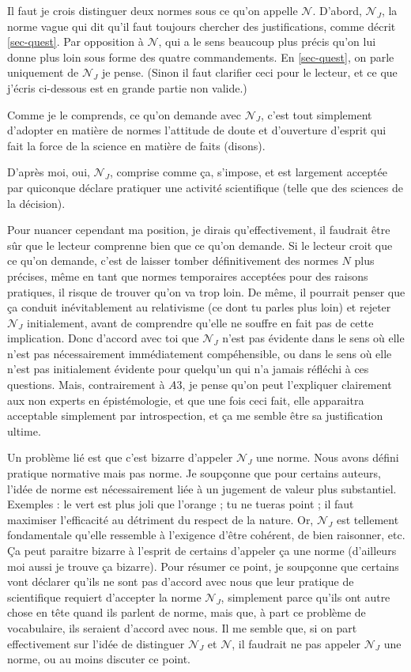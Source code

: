 \documentclass[preprint, french, english, 11pt, authoryear]{elsarticle}%
\newcommand{\adv}{\mathscr{N}}
\newcommand{\fadv}{\mathscr{N}_J}%
\begin{document}
Il faut je crois distinguer deux normes sous ce qu’on appelle $\adv$. D’abord, $\fadv$, la norme vague qui dit qu’il faut toujours chercher des justifications, comme décrit \cref{sec-quest}. Par opposition à $\adv$, qui a le sens beaucoup plus précis qu’on lui donne plus loin sous forme des quatre commandements. En \cref{sec-quest}, on parle uniquement de $\fadv$ je pense. (Sinon il faut clarifier ceci pour le lecteur, et ce que j’écris ci-dessous est en grande partie non valide.)

Comme je le comprends, ce qu’on demande avec $\fadv$, c’est tout simplement d’adopter en matière de normes l’attitude de doute et d’ouverture d’esprit qui fait la force de la science en matière de \og{}faits\fg{} (disons).

D’après moi, oui, $\fadv$, comprise comme ça, s’impose, et est largement acceptée par quiconque déclare pratiquer une activité scientifique (telle que des sciences de la décision).

Pour nuancer cependant ma position, je dirais qu’effectivement, il faudrait être sûr que le lecteur comprenne bien que ce qu’on demande. Si le lecteur croit que ce qu’on demande, c’est de laisser tomber définitivement des normes $N$ plus précises, même en tant que normes temporaires acceptées pour des raisons pratiques, il risque de trouver qu’on va trop loin. De même, il pourrait penser que ça conduit inévitablement au relativisme (ce dont tu parles plus loin) et rejeter $\fadv$ initialement, avant de comprendre qu’elle ne souffre en fait pas de cette implication. Donc d’accord avec toi que $\fadv$ n’est pas évidente dans le sens où elle n’est pas nécessairement immédiatement compéhensible, ou dans le sens où elle n’est pas initialement évidente pour quelqu’un qui n’a jamais réfléchi à ces questions. Mais, contrairement à $A3$, je pense qu’on peut l’expliquer clairement aux non experts en épistémologie, et que une fois ceci fait, elle apparaitra acceptable simplement par introspection, et ça me semble être sa justification ultime.

Un problème lié est que c’est bizarre d’appeler $\fadv$ une norme. Nous avons défini pratique normative mais pas norme. Je soupçonne que pour certains auteurs, l’idée de norme est nécessairement liée à un jugement de valeur plus substantiel. Exemples : le vert est plus joli que l’orange ; tu ne tueras point ; il faut maximiser l’efficacité au détriment du respect de la nature. Or, $\fadv$ est tellement fondamentale qu’elle ressemble à l’exigence d’être cohérent, de bien raisonner, etc. Ça peut paraitre bizarre à l’esprit de certains d’appeler ça une norme (d’ailleurs moi aussi je trouve ça bizarre). Pour résumer ce point, je soupçonne que certains vont déclarer qu’ils ne sont pas d’accord avec nous que leur pratique de scientifique requiert d’accepter la norme $\fadv$, simplement parce qu’ils ont autre chose en tête quand ils parlent de norme, mais que, à part ce problème de vocabulaire, ils seraient d’accord avec nous. Il me semble que, si on part effectivement sur l’idée de distinguer $\fadv$ et $\adv$, il faudrait ne pas appeler $\fadv$ une norme, ou au moins discuter ce point.
\end{document}
